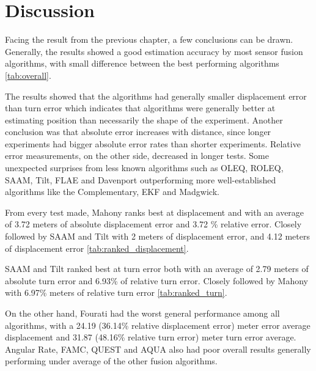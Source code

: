 \section{Discussion}
Facing the result from the previous chapter, a few conclusions can be drawn. Generally, the results showed a good estimation accuracy by most sensor fusion algorithms, with small difference between the best performing algorithms \ref{tab:overall}.



The results showed that the algorithms had generally smaller displacement error than turn error which indicates that algorithms were generally better at estimating position than necessarily the shape of the experiment. Another conclusion was that absolute error increases with distance, since longer experiments had bigger absolute error rates than shorter experiments. Relative error measurements, on the other side, decreased in longer tests. Some unexpected surprises from less known algorithms such as OLEQ, ROLEQ, SAAM, Tilt, FLAE and Davenport outperforming more well-established algorithms like the Complementary, EKF and Madgwick.

From every test made, Mahony ranks best at displacement and with an average of 3.72 meters of absolute displacement error and 3.72 \% relative error. Closely followed by SAAM and Tilt with 2 meters of displacement error, and 4.12 meters of displacement error \ref{tab:ranked_displacement}.



SAAM and Tilt ranked best at turn error both with an average of 2.79 meters of absolute turn error and 6.93\% of relative turn error. Closely followed by Mahony with 6.97\% meters of relative turn error \ref{tab:ranked_turn}.



On the other hand, Fourati had the worst general performance among all algorithms, with a 24.19 (36.14\% relative displacement error) meter error average displacement and 31.87 (48.16\% relative turn error) meter turn error average. Angular Rate, FAMC, QUEST and AQUA also had poor overall results generally performing under average of the other fusion algorithms.

